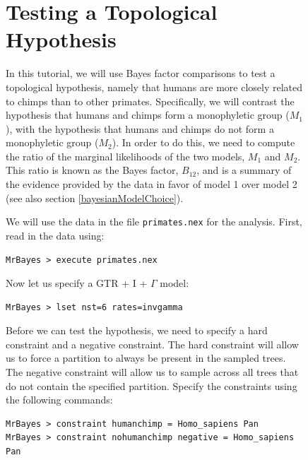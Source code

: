 \documentclass[12pt]{book}
\newcommand{\ttt}[1]{\texttt{#1}}
\begin{document}
\begin{figure}[h]
\section{Testing a Topological Hypothesis}

In this tutorial, we will use Bayes factor comparisons to test a topological hypothesis, namely
that humans are more closely related to chimps than to other primates. Specifically, we will
contrast the hypothesis that humans and chimps form a monophyletic group ($M_{1}$), with the
hypothesis that humans and chimps do not form a monophyletic group ($M_{2}$). In order to do this,
we need to compute the ratio of the marginal likelihoods of the two models, $M_{1}$ and $M_{2}$.
This ratio is known as the Bayes factor, $B_{12}$, and is a summary of the evidence provided by the
data in favor of model 1 over model 2 \citep{kass95} (see also section \ref{bayesianModelChoice}).

We will use the data in the file \ttt{primates.nex} for the analysis. First, read in the data
using:

\begin{singlespacing}
\small
\begin{verbatim}
MrBayes > execute primates.nex
\end{verbatim}
\end{singlespacing}
\normalsize

Now let us specify a GTR + I + $\Gamma$ model:

\begin{singlespacing}
\small
\begin{verbatim}
MrBayes > lset nst=6 rates=invgamma
\end{verbatim}
\end{singlespacing}
\normalsize

Before we can test the hypothesis, we need to specify a hard constraint and a negative constraint.
The hard constraint will allow us to force a partition to always be present in the sampled trees.
The negative constraint will allow us to sample across all trees that do not contain the specified
partition. Specify the constraints using the following commands:

\begin{singlespacing}
\small
\begin{verbatim}
MrBayes > constraint humanchimp = Homo_sapiens Pan
MrBayes > constraint nohumanchimp negative = Homo_sapiens Pan
\end{verbatim}
\end{singlespacing}
\normalsize


\end{figure}
\end{document}
